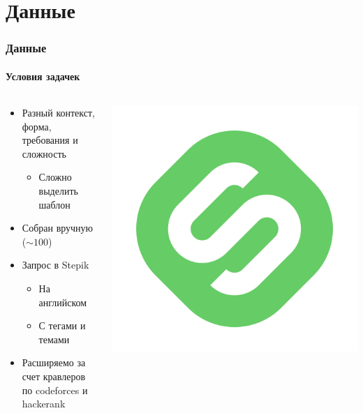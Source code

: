 \documentclass[10pt]{beamer}
\begin{document}
\section{Данные}
\begin{frame}
\frametitle{Данные}
\framesubtitle{Условия задачек}

\begin{columns}
    \begin{column}{0.5\textwidth}
        \begin{itemize}
            \item Разный контекст, форма, требования и сложность
            \begin{itemize}
                \item Сложно выделить шаблон
            \end{itemize}
            \item Собран вручную ($\sim 100$)
            \item Запрос в Stepik
            \begin{itemize}
                \item На английском
                \item С тегами и темами
            \end{itemize}
            \item Расширяемо за счет кравлеров по codeforces и hackerank
        \end{itemize}
    \end{column}
    \begin{column}{0.5\textwidth}
        \begin{columns}
            \begin{column}{0.35\textwidth}
                \begin{center}
                    \includegraphics[width=\textwidth]{images/stepik.png}

\end{center}
\end{column}
\end{columns}
\end{column}
\end{columns}
\end{frame}
\end{document}

